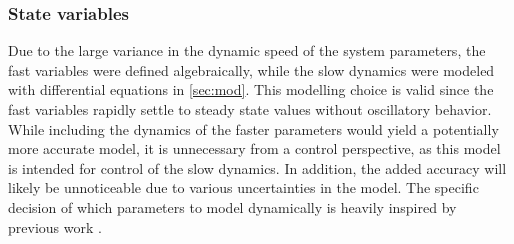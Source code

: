 \newpage

\subsubsection{State variables}

Due to the large variance in the dynamic speed of the system parameters, the fast variables were defined algebraically, while the slow dynamics were modeled with differential equations in \cref{sec:mod}. This modelling choice is valid since the fast variables rapidly settle to steady state values without oscillatory behavior. \\

While including the dynamics of the faster parameters would yield a potentially more accurate model, it is unnecessary from a control perspective, as this model is intended for control of the slow dynamics. In addition, the added accuracy will likely be unnoticeable due to various uncertainties in the model. The specific decision of which parameters to model dynamically is heavily inspired by previous work \cite{Sorensen2013}.


